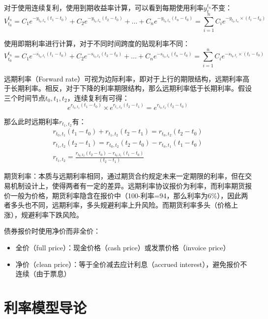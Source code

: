 \documentclass[11pt]{article}
\begin{document}
对于使用连续复利，使用到期收益率计算，可以看到每期使用利率$y_t^{t_n}$不变：
\begin{equation*}
    V_{t_0}^{t_n} = C_1 e^{-y_{t_0,t_n}(t_1-t_0)} + C_2 e^{-y_{t_0,t_n}(t_2-t_0)}
    + \dots + C_n e^{-y_{t_0,t_n}(t_n-t_0)}
    = \sum_{i=1}^{n} C_i e^{-y_{t_0,t_n}\times (t_i-t_0)}
\end{equation*}

使用即期利率进行计算，对于不同时间跨度的贴现利率不同：
\begin{equation*}
    V_{t_0}^{t_n} = C_1 e^{-s_{t_0,t_1}(t_1-t_0)} + C_2 e^{-s_{t_0,t_2}(t_2-t_0)}
    + \dots + C_n e^{-s_{t_0,t_n}(t_n-t_0)}
    = \sum_{i=1}^{n} C_i e^{-s_{t_0,t_i}\times (t_i-t_0)}
\end{equation*}

远期利率（Forward rate）可视为边际利率，即对于上行的期限结构，远期利率高于长期利率。相反，对于下降的利率期限结构，那么远期利率低于长期利率。假设三个时间节点$t_0,t_1,t_2$，连续复利有可得：
\begin{equation*}
    e^{r_{t_0,t_1}(t_1-t_0)} \times e^{r_{t_1,t_2}(t_2-t_1)} = e^{r_{t_0,t_2}(t_2-t_0)}
\end{equation*}

那么此时远期利率$r_{t_1,t_2}$有：
\begin{gather*}
    r_{t_0,t_1}(t_1-t_0) + r_{t_1,t_2}(t_2-t_1) = r_{t_0,t_2}(t_2-t_0) \\
    r_{t_1,t_2}(t_2-t_1) = r_{t_0,t_2}(t_2-t_0) - r_{t_0,t_1}(t_1-t_0) \\
    r_{t_1,t_2} = \frac{r_{t_0,t_2}(t_2-t_0) - r_{t_0,t_1}(t_1-t_0)}{(t_2-t_1)}
\end{gather*}

期货利率：本质与远期利率相同，通过期货合约规定未来一定期限的利率，但在交易机制设计上，使得两者有一定的差异。远期利率协议报价为利率，而利率期货报价一般为价格，期货利率隐含在报价中（100-利率=94，那么利率为6\%），因此两者多头也不同，远期利率，多头规避利率上升风险。而期货利率多头（价格上涨），规避利率下跌风险。

债券报价时使用净价而非全价：
\begin{itemize}
    \item 全价（full price）：现金价格（cash price）或发票价格（invoice price）
    \item 净价（clean price）：等于全价减去应计利息（accrued interest），避免报价不连续（由于票息）
\end{itemize}

\section{利率模型导论}
\end{document}
